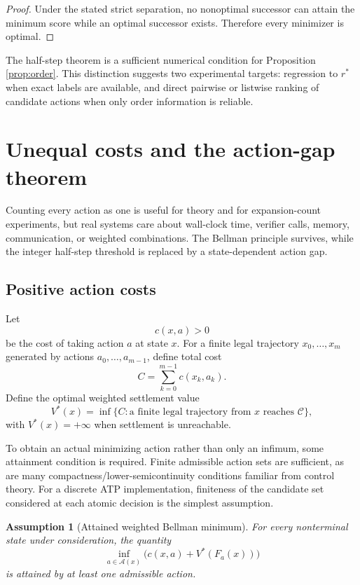 \documentclass[11pt,letterpaper]{article}
\newtheorem{assumption}[theorem]{Assumption}
\theoremstyle{remark}
\newcommand{\Cset}{\mathcal C}
\newcommand{\A}{\mathcal A}
\newcommand{\rstar}{r^{\!*}}
\begin{document}
\begin{proof}
Under the stated strict separation, no nonoptimal successor can attain the minimum score while an optimal successor exists. Therefore every minimizer is optimal.
\end{proof}

The half-step theorem is a sufficient numerical condition for Proposition \ref{prop:order}. This distinction suggests two experimental targets: regression to $\rstar$ when exact labels are available, and direct pairwise or listwise ranking of candidate actions when only order information is reliable.

\section{Unequal costs and the action-gap theorem}\label{sec:weighted}

Counting every action as one is useful for theory and for expansion-count experiments, but real systems care about wall-clock time, verifier calls, memory, communication, or weighted combinations. The Bellman principle survives, while the integer half-step threshold is replaced by a state-dependent action gap.

\subsection{Positive action costs}

Let
\[
c(x,a)>0
\]
be the cost of taking action $a$ at state $x$. For a finite legal trajectory $x_0,\ldots,x_m$ generated by actions $a_0,\ldots,a_{m-1}$, define total cost
\[
C=\sum_{k=0}^{m-1}c(x_k,a_k).
\]
Define the optimal weighted settlement value
\[
V^*(x)=\inf\{C:\text{a finite legal trajectory from $x$ reaches $\Cset$}\},
\]
with $V^*(x)=+\infty$ when settlement is unreachable.

To obtain an actual minimizing action rather than only an infimum, some attainment condition is required. Finite admissible action sets are sufficient, as are many compactness/lower-semicontinuity conditions familiar from control theory. For a discrete ATP implementation, finiteness of the candidate set considered at each atomic decision is the simplest assumption.

\begin{assumption}[Attained weighted Bellman minimum]\label{ass:attain}
For every nonterminal state under consideration, the quantity
\[
\inf_{a\in\A(x)}\bigl(c(x,a)+V^*(F_a(x))\bigr)
\]
is attained by at least one admissible action.
\end{assumption}
\end{document}
